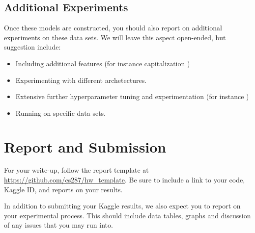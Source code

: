 \documentclass[11pt]{article}
\begin{document}
\subsection{} 

\subsection{Additional Experiments}

Once these models are constructed, you should also report on
additional experiments on these data sets. We will leave this aspect
open-ended, but suggestion include:

\begin{itemize}
\item Including additional features (for instance capitalization \cite{c&w})
\item Experimenting with different archetectures. 
\item Extensive further hyperparameter tuning and experimentation (for instance \cite{})
\item Running on specific data sets. 
\end{itemize}

\section{Report and Submission}

For your write-up, follow the report template at
\url{https://github.com/cs287/hw_template}. Be sure to include a link
to your code, Kaggle ID, and reports on your results.

In addition to submitting your Kaggle results, we also expect you to report on your 
experimental process. This should include data tables, graphs and discussion of any 
issues that you may run into. 
\end{document}
